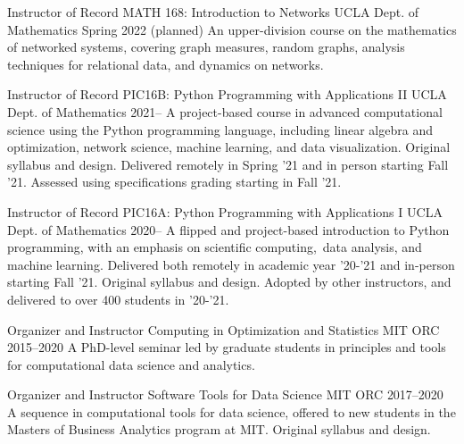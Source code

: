 
\begin{cventries}

  \cventry
    {Instructor of Record}
    {MATH 168: Introduction to Networks}
    {UCLA Dept. of Mathematics}
    {Spring 2022 (planned)}
    {An upper-division course on the mathematics of networked systems, covering graph measures, random graphs, analysis techniques for relational data, and dynamics on networks.}

  \cventry
      {Instructor of Record}
      {PIC16B: Python Programming with Applications II}
      {UCLA Dept. of Mathematics}
      {2021--}
      {A project-based course in advanced computational science using the Python programming language, including linear algebra and optimization, network science, machine learning, and data visualization.
      Original syllabus and design.
      Delivered remotely in Spring '21 and in person starting Fall '21. 
      Assessed using specifications grading starting in Fall '21. }

  \cventry
    {Instructor of Record}
    {PIC16A: Python Programming with Applications I}
    {UCLA Dept. of Mathematics}
    {2020--}
    {A flipped and project-based introduction to Python programming, with an emphasis on scientific computing, data analysis, and machine learning. Delivered both remotely in academic year '20-'21 and in-person starting Fall '21. 
    Original syllabus and design.
    Adopted by other instructors, and delivered to over 400 students in '20-'21. 
    }

  \cventry
    {Organizer and Instructor} %
    {Computing in Optimization and Statistics} %
    {MIT ORC} %
    {2015--2020} %
    {A PhD-level seminar led by graduate students in principles and tools for computational data science and analytics.} %

  \cventry
    {Organizer and Instructor} %
    {Software Tools for Data Science} %
    {MIT ORC} %
    {2017--2020} %
    {A sequence in computational tools for data science, offered to new students in the Masters of Business Analytics program at MIT. Original syllabus and design.}  
  

\end{cventries}
